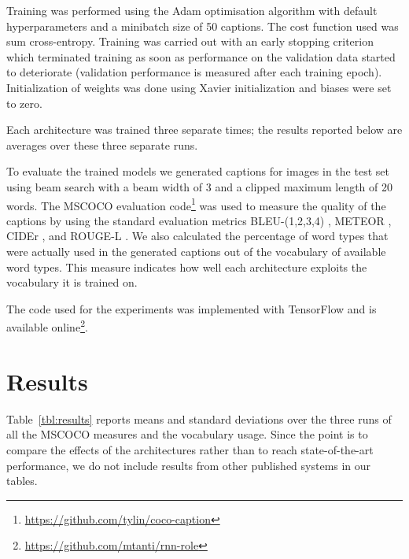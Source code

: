 \documentclass[11pt,letterpaper]{article}
\begin{document}
Training was performed using the Adam optimisation algorithm \cite{P.Kingma2014} with default hyperparameters and a minibatch size of 50 captions. The cost function used was sum cross-entropy. Training was carried out with an early stopping criterion which terminated training as soon as performance on the validation data started to deteriorate (validation performance is measured after each training epoch). Initialization of weights was done using Xavier initialization \cite{Glorot2010} and biases were set to zero.

Each architecture was trained three separate times; the results reported below are averages over these three separate runs.

To evaluate the trained models we generated captions for images in the test set using beam search with a beam width of 3 and a clipped maximum length of 20 words. The MSCOCO evaluation code\footnote{\url{https://github.com/tylin/coco-caption}} was used to measure the quality of the captions by using the standard evaluation metrics BLEU-(1,2,3,4) \cite{Papineni2002}, METEOR \cite{Banerjee2005}, CIDEr \cite{Vedantam2015}, and ROUGE-L \cite{Lin2004}. We also calculated the percentage of word types that were actually used in the generated captions out of the vocabulary of available word types. This measure indicates how well each architecture exploits the vocabulary it is trained on.

The code used for the experiments was implemented with TensorFlow and is available online\footnote{\url{https://github.com/mtanti/rnn-role}}.

\section{Results}\label{sec:results}

Table~\ref{tbl:results} reports means and standard deviations over the three runs of all the MSCOCO measures and the vocabulary usage. Since the point is to compare the effects of the architectures rather than to reach state-of-the-art performance, we do not include results from other published systems in our tables.
\end{document}
